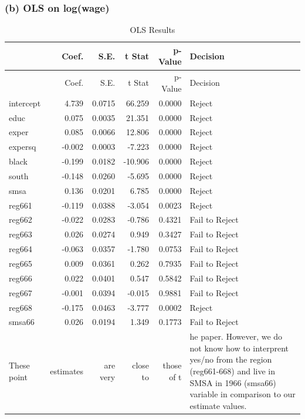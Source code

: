 \documentclass[11pt,]{article}
\newenvironment{Shaded}{\begin{snugshade}}{\end{snugshade}}
\newcommand{\KeywordTok}[1]{\textcolor[rgb]{0.13,0.29,0.53}{\textbf{#1}}}
\newcommand{\StringTok}[1]{\textcolor[rgb]{0.31,0.60,0.02}{#1}}
\newcommand{\OperatorTok}[1]{\textcolor[rgb]{0.81,0.36,0.00}{\textbf{#1}}}
\newcommand{\NormalTok}[1]{#1}
\begin{document}
\subsubsection{(b) OLS on log(wage)}\label{b-ols-on-logwage}

\begin{Shaded}
\end{Shaded}

\begin{longtable}[]{@{}lrrrrl@{}}
\caption{OLS Results}\tabularnewline
\toprule
& Coef. & S.E. & t Stat & p-Value & Decision\tabularnewline
\midrule
\endfirsthead
\toprule
& Coef. & S.E. & t Stat & p-Value & Decision\tabularnewline
\midrule
\endhead
intercept & 4.739 & 0.0715 & 66.259 & 0.0000 & Reject\tabularnewline
educ & 0.075 & 0.0035 & 21.351 & 0.0000 & Reject\tabularnewline
exper & 0.085 & 0.0066 & 12.806 & 0.0000 & Reject\tabularnewline
expersq & -0.002 & 0.0003 & -7.223 & 0.0000 & Reject\tabularnewline
black & -0.199 & 0.0182 & -10.906 & 0.0000 & Reject\tabularnewline
south & -0.148 & 0.0260 & -5.695 & 0.0000 & Reject\tabularnewline
smsa & 0.136 & 0.0201 & 6.785 & 0.0000 & Reject\tabularnewline
reg661 & -0.119 & 0.0388 & -3.054 & 0.0023 & Reject\tabularnewline
reg662 & -0.022 & 0.0283 & -0.786 & 0.4321 & Fail to
Reject\tabularnewline
reg663 & 0.026 & 0.0274 & 0.949 & 0.3427 & Fail to Reject\tabularnewline
reg664 & -0.063 & 0.0357 & -1.780 & 0.0753 & Fail to
Reject\tabularnewline
reg665 & 0.009 & 0.0361 & 0.262 & 0.7935 & Fail to Reject\tabularnewline
reg666 & 0.022 & 0.0401 & 0.547 & 0.5842 & Fail to Reject\tabularnewline
reg667 & -0.001 & 0.0394 & -0.015 & 0.9881 & Fail to
Reject\tabularnewline
reg668 & -0.175 & 0.0463 & -3.777 & 0.0002 & Reject\tabularnewline
smsa66 & 0.026 & 0.0194 & 1.349 & 0.1773 & Fail to Reject\tabularnewline
These point & estimates & are very & close to & those of t & he paper.
However, we do not know how to interprent yes/no from the region
(reg661-668) and live in SMSA in 1966 (smsa66) variable in comparison to
our estimate values.\tabularnewline
\bottomrule
\end{longtable}
\end{document}
